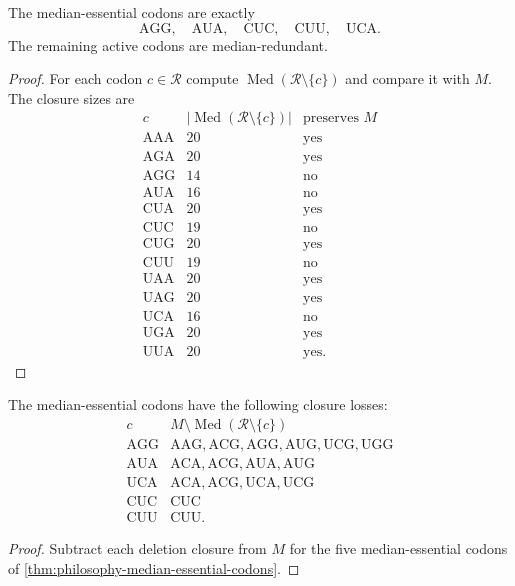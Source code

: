 \begin{theorem}
\label{thm:philosophy-median-essential-codons}
The median-essential codons are exactly
$$
  \mathrm{AGG},\quad \mathrm{AUA},\quad
  \mathrm{CUC},\quad \mathrm{CUU},\quad \mathrm{UCA}.
$$
The remaining active codons are median-redundant.
\end{theorem}
\begin{proof}
For each codon $c\in\mathcal{R}$ compute
$\operatorname{Med}(\mathcal{R}\setminus\{c\})$ and compare it with
$M$. The closure sizes are
$$
\begin{array}{c|c|c}
  c & |\operatorname{Med}(\mathcal{R}\setminus\{c\})| & \text{preserves }M\\
  \hline
  \mathrm{AAA} & 20 & \text{yes}\\
  \mathrm{AGA} & 20 & \text{yes}\\
  \mathrm{AGG} & 14 & \text{no}\\
  \mathrm{AUA} & 16 & \text{no}\\
  \mathrm{CUA} & 20 & \text{yes}\\
  \mathrm{CUC} & 19 & \text{no}\\
  \mathrm{CUG} & 20 & \text{yes}\\
  \mathrm{CUU} & 19 & \text{no}\\
  \mathrm{UAA} & 20 & \text{yes}\\
  \mathrm{UAG} & 20 & \text{yes}\\
  \mathrm{UCA} & 16 & \text{no}\\
  \mathrm{UGA} & 20 & \text{yes}\\
  \mathrm{UUA} & 20 & \text{yes}.
\end{array}
$$
\end{proof}

\begin{theorem}
\label{thm:philosophy-median-deletion-losses}
The median-essential codons have the following closure losses:
$$
\begin{array}{c|l}
  c & M\setminus\operatorname{Med}(\mathcal{R}\setminus\{c\})\\
  \hline
  \mathrm{AGG} &
    \mathrm{AAG},\mathrm{ACG},\mathrm{AGG},
    \mathrm{AUG},\mathrm{UCG},\mathrm{UGG}\\
  \mathrm{AUA} &
    \mathrm{ACA},\mathrm{ACG},\mathrm{AUA},\mathrm{AUG}\\
  \mathrm{UCA} &
    \mathrm{ACA},\mathrm{ACG},\mathrm{UCA},\mathrm{UCG}\\
  \mathrm{CUC} &
    \mathrm{CUC}\\
  \mathrm{CUU} &
    \mathrm{CUU}.
\end{array}
$$
\end{theorem}
\begin{proof}
Subtract each deletion closure from $M$ for the five
median-essential codons of
\autoref{thm:philosophy-median-essential-codons}.
\end{proof}

